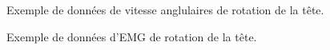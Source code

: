 \documentclass[letterpaper, twoside, 12pt, memoire, creativecommons, hyperref]{thETS}
\begin{document}
\begin{figure}
	\centering
	\caption{Exemple de données de vitesse anglulaires de rotation de la tête.}
	\label{fig:validExVit}
\end{figure}

\begin{figure}
	\centering
	\caption{Exemple de données d'EMG de rotation de la tête.}
	\label{fig:validExEMG}
\end{figure}
\end{document}
